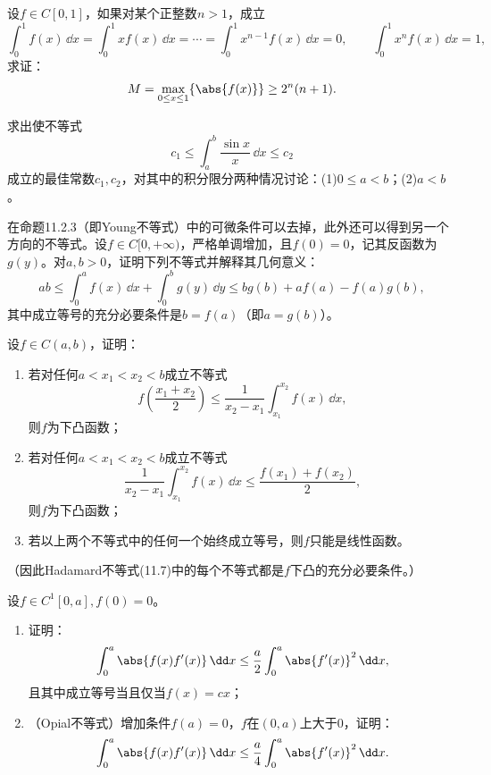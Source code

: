 \begin{xreferenceproblem}[4]
设$f\in C[0,1]$，如果对某个正整数$n>1$，成立
  \[
    \int_0^1f(x)\,\dd x=\int_0^1xf(x)\,\dd x=\cdots
    =\int_0^1x^{n-1}f(x)\,\dd x=0,
    \qquad
    \int_0^1x^nf(x)\,\dd x=1,
  \]
  求证：
  \[
    M=\max_{0\le x\le1}\{\abs{f(x)}\}\ge2^n(n+1).
  \]
\end{xreferenceproblem}

\begin{xreferenceproblem}[5]
求出使不等式
  \[
    c_1\le\int_a^b\frac{\sin x}{x}\,\dd x\le c_2
  \]
  成立的最佳常数$c_1,c_2$，对其中的积分限分两种情况讨论：(1)$0\le a<b$；(2)$a<b$。
\end{xreferenceproblem}

\begin{xreferenceproblem}[6]
在命题11.2.3（即Young不等式）中的可微条件可以去掉，此外还可以得到另一个方向的不等式。设$f\in C[0,+\infty)$，严格单调增加，且$f(0)=0$，记其反函数为$g(y)$。对$a,b>0$，证明下列不等式并解释其几何意义：
  \[
    ab\le\int_0^af(x)\,\dd x+\int_0^bg(y)\,\dd y
    \le bg(b)+af(a)-f(a)g(b),
  \]
  其中成立等号的充分必要条件是$b=f(a)$（即$a=g(b)$）。
\end{xreferenceproblem}

\begin{xreferenceproblem}[7]
设$f\in C(a,b)$，证明：
  \begin{enumerate}[label=(\arabic*)]
    \item 若对任何$a<x_1<x_2<b$成立不等式
    \[
      f\left(\frac{x_1+x_2}{2}\right)
      \le\frac1{x_2-x_1}\int_{x_1}^{x_2}f(x)\,\dd x,
    \]
    则$f$为下凸函数；
    \item 若对任何$a<x_1<x_2<b$成立不等式
    \[
      \frac1{x_2-x_1}\int_{x_1}^{x_2}f(x)\,\dd x
      \le\frac{f(x_1)+f(x_2)}2,
    \]
    则$f$为下凸函数；
    \item 若以上两个不等式中的任何一个始终成立等号，则$f$只能是线性函数。
  \end{enumerate}
  （因此Hadamard不等式(11.7)中的每个不等式都是$f$下凸的充分必要条件。）
\end{xreferenceproblem}

\begin{xreferenceproblem}[8]
设$f\in C^1[0,a],f(0)=0$。
  \begin{enumerate}[label=(\arabic*)]
    \item 证明：
    \[
      \int_0^a\abs{f(x)f'(x)}\,\dd x
      \le\frac a2\int_0^a\abs{f'(x)}^2\,\dd x,
    \]
    且其中成立等号当且仅当$f(x)=cx$；
    \item （Opial不等式）增加条件$f(a)=0$，$f$在$(0,a)$上大于0，证明：
    \[
      \int_0^a\abs{f(x)f'(x)}\,\dd x
      \le\frac a4\int_0^a\abs{f'(x)}^2\,\dd x.
    \]
  \end{enumerate}
\end{xreferenceproblem}

